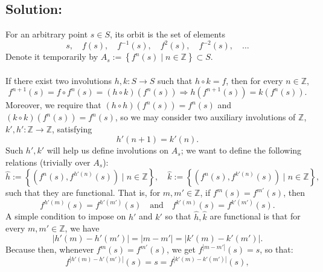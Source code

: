 \documentclass[11pt, a4paper, oneside]{article}
\newcommand{\solution}[1][]{\subsection*{#1}\hfill \par}
\theoremstyle{remark}
\theoremstyle{lemma}
\begin{document}
\solution[Solution:]
For an arbitrary point \( s \in S \), its orbit is the set of elements
\[
s,\quad f\left(s\right),\quad f^{-1}\left(s\right),\quad  f^{2}\left(s\right),\quad f^{-2}\left(s\right),\quad \ldots
\]
Denote it temporarily by \( A_{s} := \left\{ f^n\left(s\right) \mid n \in \mathbb{Z} \right\} \subset S \).
\\\\
If there exist two involutions \( h, k : S \rightarrow S \) such that \( h \circ k = f \), then for every \( n \in \mathbb{Z} \),
\[
f^{n+1}\left(s\right) = f \circ f^n\left(s\right) = \left(h \circ k\right)\left(f^n\left(s\right)\right) \Rightarrow h\left(f^{n+1}\left(s\right)\right) = k\left(f^n\left(s\right)\right).
\]
Moreover, we require that \( \left(h \circ h\right)\left(f^n\left(s\right)\right) = f^n\left(s\right) \) and \( \left(k \circ k\right)\left(f^n\left(s\right)\right) = f^n\left(s\right) \), so we may consider two auxiliary involutions of \( \mathbb{Z} \), \( k', h' : \mathbb{Z} \rightarrow \mathbb{Z} \), satisfying
\begin{equation}
\label{2.1}
\tag{1}
h'\left(n+1\right) = k'\left(n\right).
\end{equation}
Such \( h', k' \) will help us define involutions on \( A_s \); we want to define the following relations (trivially over \( A_s \)):
\[
\hat{h} := \left\{ \left( f^n\left(s\right), f^{h'\left(n\right)}\left(s\right) \right) \mid n \in \mathbb{Z} \right\}, \quad \hat{k} := \left\{ \left( f^n\left(s\right), f^{k'\left(n\right)}\left(s\right) \right) \mid n \in \mathbb{Z} \right\},
\]
such that they are functional. That is, for \( m, m' \in \mathbb{Z} \), if \( f^m\left(s\right) = f^{m'}\left(s\right) \), then
\[
f^{h'\left(m\right)}\left(s\right) = f^{h'\left(m'\right)}\left(s\right)\quad \text{and} \quad f^{k'\left(m\right)}\left(s\right) = f^{k'\left(m'\right)}\left(s\right).
\]
A simple condition to impose on \( h' \) and \( k' \) so that \( \hat{h}, \hat{k} \) are functional is that for every \( m, m' \in \mathbb{Z} \), we have
\begin{equation}
\label{2.2}
\tag{2}
\left| h'\left(m\right) - h'\left(m'\right) \right| = \left| m - m' \right| = \left| k'\left(m\right) - k'\left(m'\right) \right|.
\end{equation}
Because then, whenever \( f^m\left(s\right) = f^{m'}\left(s\right) \), we get \( f^{\left| m - m' \right|}\left(s\right) = s \), so that:
\[
f^{\left| h'\left(m\right) - h'\left(m'\right) \right|}\left(s\right) = s = f^{\left| k'\left(m\right) - k'\left(m'\right) \right|}\left(s\right),
\]
\end{document}

